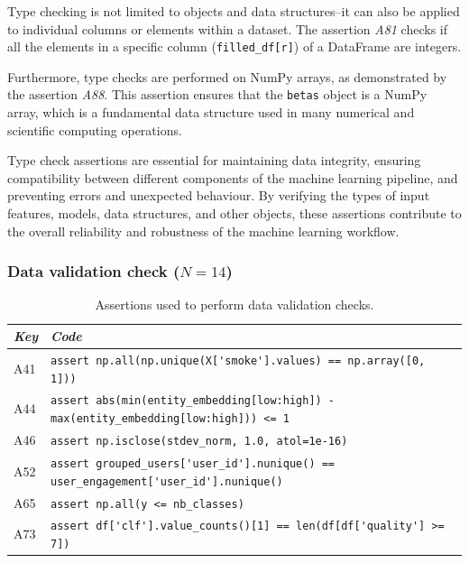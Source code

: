 Type checking is not limited to objects and data structures--it can also be applied to individual columns or elements within a dataset. The assertion \emph{A81} checks if all the elements in a specific column (\lstinline[]$filled_df[r]$) of a DataFrame are integers.

Furthermore, type checks are performed on NumPy arrays, as demonstrated by the assertion \emph{A88}. This assertion ensures that the \lstinline{betas} object is a NumPy array, which is a fundamental data structure used in many numerical and scientific computing operations.

Type check assertions are essential for maintaining data integrity, ensuring compatibility between different components of the machine learning pipeline, and preventing errors and unexpected behaviour. By verifying the types of input features, models, data structures, and other objects, these assertions contribute to the overall reliability and robustness of the machine learning workflow.


\subsubsection{Data validation check ($N = 14$)}

\begin{table}
  \centering
  \caption{Assertions used to perform data validation checks.}
  \begin{tabular}{@{}m{} m{}@{}}
    \toprule
    \emph{\textbf{Key}}&
    \emph{\textbf{Code}}\\
    \midrule

    A41 &
    \lstinline[]$assert np.all(np.unique(X['smoke'].values) == np.array([0, 1]))$\\

    A44 &
    \lstinline[]$assert abs(min(entity_embedding[low:high]) - max(entity_embedding[low:high])) <= 1$\\

    A46 &
    \lstinline[]$assert np.isclose(stdev_norm, 1.0, atol=1e-16)$\\

    A52 &
    \lstinline[]$assert grouped_users['user_id'].nunique() == user_engagement['user_id'].nunique()$\\

    A65 &
    \lstinline[]$assert np.all(y <= nb_classes)$\\

    A73 &
    \lstinline[]$assert df['clf'].value_counts()[1] == len(df[df['quality'] >= 7])$\\
    \bottomrule
  \end{tabular}
  \label{tab:data-validation}
\end{table}

